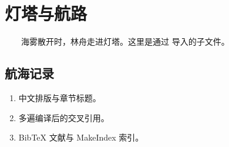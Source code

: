 \section{灯塔与航路}
\label{sec:story}
　　海雾散开时，林舟走进灯塔。这里是通过 \verb|| 导入的子文件。
\subsection{航海记录}
\begin{enumerate}
  \item 中文排版与章节标题。
  \item 多遍编译后的交叉引用。
  \item BibTeX 文献与 MakeIndex 索引。
\end{enumerate}
